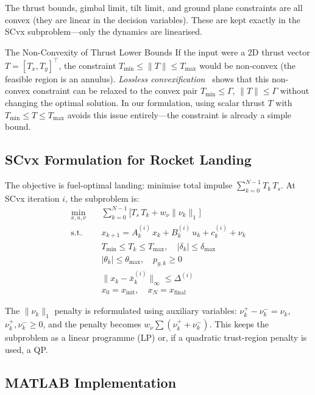 The thrust bounds, gimbal limit, tilt limit, and ground plane constraints are all convex (they are linear in the decision variables). These are kept exactly in the SCvx subproblem---only the dynamics are linearised.

\begin{alertbox}{The Non-Convexity of Thrust Lower Bounds}
	If the input were a 2D thrust vector $T = [T_x, T_y]^\top$, the constraint $T_{\min} \le \|T\| \le T_{\max}$ would be non-convex (the feasible region is an annulus). \emph{Lossless convexification}~\cite{Acikmese2007} shows that this non-convex constraint can be relaxed to the convex pair $T_{\min} \le \Gamma$, $\|T\| \le \Gamma$ without changing the optimal solution. In our formulation, using scalar thrust $T$ with $T_{\min} \le T \le T_{\max}$ avoids this issue entirely---the constraint is already a simple bound.
\end{alertbox}

\subsection{SCvx Formulation for Rocket Landing}

The objective is fuel-optimal landing: minimise total impulse $\sum_{k=0}^{N-1} T_k\, T_s$. At SCvx iteration $i$, the subproblem is:
\begin{align*}
	\min_{x, u, \nu} \quad & \sum_{k=0}^{N-1} \bigl[T_s\, T_k + w_\nu \|\nu_k\|_1\bigr] \\[4pt]
	\text{s.t.} \quad
	& x_{k+1} = A_k^{(i)}\, x_k + B_k^{(i)}\, u_k + c_k^{(i)} + \nu_k \\
	& T_{\min} \le T_k \le T_{\max}, \quad |\delta_k| \le \delta_{\max} \\
	& |\theta_k| \le \theta_{\max}, \quad p_{y,k} \ge 0 \\
	& \|x_k - \bar{x}_k^{(i)}\|_\infty \le \Delta^{(i)} \\
	& x_0 = x_{\text{init}}, \quad x_N = x_{\text{final}}
\end{align*}

The $\|\nu_k\|_1$ penalty is reformulated using auxiliary variables: $\nu_k^+ - \nu_k^- = \nu_k$, $\nu_k^+, \nu_k^- \ge 0$, and the penalty becomes $w_\nu \sum (\nu_k^+ + \nu_k^-)$. This keeps the subproblem as a linear programme (LP) or, if a quadratic trust-region penalty is used, a QP.

\subsection{MATLAB Implementation}

